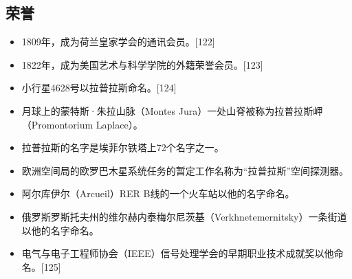 \subsection{荣誉}  
\begin{itemize}
\item 1809年，成为荷兰皇家学会的通讯会员。[122]  
\item 1822年，成为美国艺术与科学学院的外籍荣誉会员。[123]  
\item 小行星4628号以拉普拉斯命名。[124]  
\item 月球上的蒙特斯·朱拉山脉（Montes Jura）一处山脊被称为拉普拉斯岬（Promontorium Laplace）。  
\item 拉普拉斯的名字是埃菲尔铁塔上72个名字之一。  
\item 欧洲空间局的欧罗巴木星系统任务的暂定工作名称为“拉普拉斯”空间探测器。  
\item 阿尔库伊尔（Arcueil）RER B线的一个火车站以他的名字命名。  
\item 俄罗斯罗斯托夫州的维尔赫内泰梅尔尼茨基（Verkhnetemernitsky）一条街道以他的名字命名。  
\item 电气与电子工程师协会（IEEE）信号处理学会的早期职业技术成就奖以他命名。[125]
\end{itemize}
